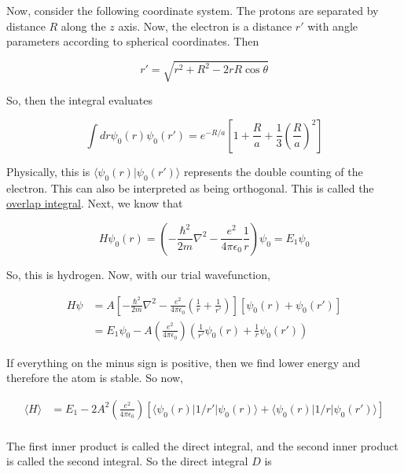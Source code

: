 \documentclass{article}
\newtheorem{one minute paper}[theorem]{One Minute Paper}
\begin{document}
Now, consider the following coordinate system. The protons are separated by distance $R$ along the $z$ axis. Now, the electron is a distance $r'$ with angle parameters according to spherical coordinates. Then 

\begin{equation}
    r' = \sqrt{r^2 + R^2 - 2rR\cos\theta}
\end{equation}

So, then the integral evaluates

\begin{equation}
    \int dr \psi_0(r)\psi_0(r') = e^{-R/a}\left[  1 + \frac{R}{a} + \frac{1}{3}\left( \frac{R}{a} \right)^2 \right]
\end{equation}

Physically, this is $\langle \psi_0(r) | \psi_0(r') \rangle$ represents the double counting of the electron. This can also be interpreted as being orthogonal. This is called the \underline{overlap integral}. Next, we know that 

\begin{equation}
    H\psi_0(r) = \left( -\frac{\hbar^2}{2m}\nabla^2 - \frac{e^2}{4\pi \epsilon_0}\frac{1}{r} \right)\psi_0 = E_1 \psi_0
\end{equation}

So, this is hydrogen. Now, with our trial wavefunction, 

\begin{align*}
    H\psi &= A \left[ -\frac{\hbar^2}{2m}\nabla^2 - \frac{e^2}{4\pi \epsilon_0}\left( \frac{1}{r} + \frac{1}{r'} \right) \right]\left[ \psi_0(r) + \psi_0(r') \right] \\
    &= E_1 \psi_0 - A(\frac{e^2}{4\pi \epsilon_0})\left( \frac{1}{r'}\psi_0(r) + \frac{1}{r}\psi_0(r') \right)
\end{align*}

If everything on the minus sign is positive, then we find lower energy and therefore the atom is stable. So now, 

\begin{align*}
    \langle H \rangle &= E_1 - 2A^2\left( \frac{e^2}{4\pi \epsilon_0} \right)\left[ \langle \psi_0(r) | 1/r' | \psi_0(r)\rangle + \langle \psi_0(r) | 1/r | \psi_0(r') \rangle \right] \\
\end{align*}

The first inner product is called the direct integral, and the second inner product is called the second integral. So the direct integral $D$ is 
\end{document}
